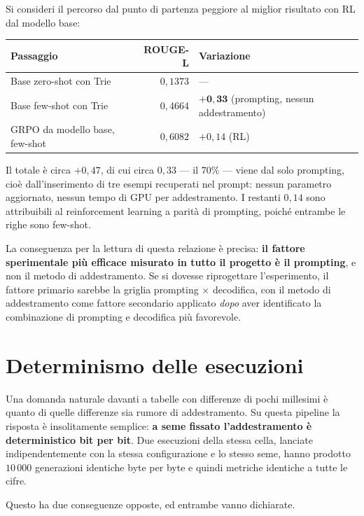 Si consideri il percorso dal punto di partenza peggiore al miglior risultato con
RL dal modello base:

\begin{center}
\begin{tabular}{lrl}
\toprule
Passaggio & ROUGE-L & Variazione \\
\midrule
Base zero-shot con Trie & $0{,}1373$ & --- \\
Base few-shot con Trie & $0{,}4664$ & $\mathbf{+0{,}33}$ \quad (prompting, nessun addestramento) \\
GRPO da modello base, few-shot & $0{,}6082$ & $+0{,}14$ \quad (RL) \\
\bottomrule
\end{tabular}
\end{center}

Il totale è circa $+0{,}47$, di cui circa $0{,}33$ --- il $70\%$ --- viene dal
solo prompting, cioè dall'inserimento di tre esempi recuperati nel prompt:
nessun parametro aggiornato, nessun tempo di GPU per addestramento. I restanti
$0{,}14$ sono attribuibili al reinforcement learning a parità di prompting,
poiché entrambe le righe sono few-shot.

La conseguenza per la lettura di questa relazione è precisa: \textbf{il fattore
sperimentale più efficace misurato in tutto il progetto è il prompting}, e non
il metodo di addestramento. Se si dovesse riprogettare l'esperimento, il fattore
primario sarebbe la griglia prompting $\times$ decodifica, con il metodo di
addestramento come fattore secondario applicato \emph{dopo} aver identificato la
combinazione di prompting e decodifica più favorevole.

\section{Determinismo delle esecuzioni}
\label{sec:determinismo}

Una domanda naturale davanti a tabelle con differenze di pochi millesimi è
quanto di quelle differenze sia rumore di addestramento. Su questa pipeline la
risposta è insolitamente semplice: \textbf{a seme fissato l'addestramento è
deterministico bit per bit}. Due esecuzioni della stessa cella, lanciate
indipendentemente con la stessa configurazione e lo stesso seme, hanno prodotto
$10\,000$ generazioni identiche byte per byte e quindi metriche identiche a
tutte le cifre.

Questo ha due conseguenze opposte, ed entrambe vanno dichiarate.

